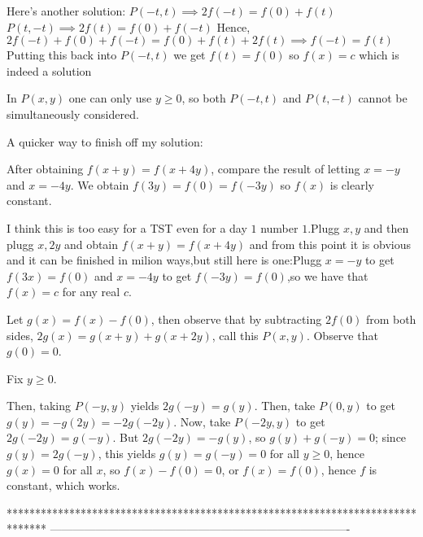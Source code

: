 \begin{solution}
	\begin{tcolorbox}Here's another solution:
$P(-t,t) \implies 2f(-t)=f(0)+f(t)$
$P(t,-t) \implies 2f(t)=f(0)+f(-t)$
Hence, $2f(-t)+f(0)+f(-t)=f(0)+f(t)+ 2f(t) \implies f(-t)=f(t)$
Putting this back into $P(-t,t)$ we get $f(t)=f(0)$ so
$ \boxed{f(x)=c} $ which is indeed a solution\end{tcolorbox}
In $P(x,y)$ one can only use $y\geq 0$, so both $P(-t,t)$ and $P(t,-t)$ cannot be simultaneously considered.
\end{solution}



\begin{solution}
	A quicker way to finish off my solution:

After obtaining $f(x+y)=f(x+4y)$, compare the result of letting $x=-y$ and $x=-4y$. We obtain $f(3y)=f(0)=f(-3y)$ so $f(x)$ is clearly constant.
\end{solution}



\begin{solution}
	I think this is too easy for a TST even for a day $1$ number $1$.Plugg $x,y$ and then plugg $x,2y$ and obtain $f(x+y)=f(x+4y)$ and from this point it is obvious and it can be finished in milion ways,but still here is one:Plugg $x=-y$ to get $f(3x)=f(0)$ and $x=-4y$ to get $f(-3y)=f(0)$,so we have that $f(x)=c$ for any real $c$.
\end{solution}



\begin{solution}
	Let $g(x) = f(x)-f(0)$, then observe that by subtracting $2f(0)$ from both sides, $2g(x) = g(x+y) + g(x+2y)$, call this $P(x,y)$. Observe that $g(0)= 0$.

Fix $y\ge 0$.

Then, taking $P(-y,y)$ yields $2g(-y) = g(y)$. Then, take $P(0,y)$ to get $g(y)=-g(2y) = -2g(-2y)$. Now, take $P(-2y,y)$ to get $2g(-2y) = g(-y)$. But $2g(-2y) = -g(y)$, so $g(y)+g(-y) = 0$; since $g(y) = 2g(-y)$, this yields $g(y) = g(-y) = 0$ for all $y\ge 0$, hence $g(x) = 0$ for all $x$, so $f(x) - f(0) = 0$, or $f(x) = f(0)$, hence $f$ is constant, which works. 
\end{solution}
*******************************************************************************
-------------------------------------------------------------------------------

